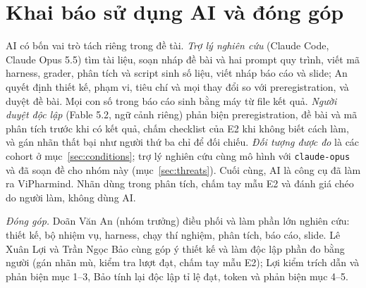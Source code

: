 \section*{Khai báo sử dụng AI và đóng góp}

AI có bốn vai trò tách riêng trong đề tài. \textit{Trợ lý nghiên cứu} (Claude Code, Claude Opus 5.5) tìm tài
liệu, soạn nháp đề bài và hai prompt quy trình, viết mã harness, grader, phân tích và script sinh số liệu, viết
nháp báo cáo và slide; An quyết định thiết kế, phạm vi, tiêu chí và mọi thay đổi so với preregistration, và duyệt
đề bài. Mọi con số trong báo cáo sinh bằng máy từ file kết quả. \textit{Người duyệt độc lập} (Fable 5.2, ngữ
cảnh riêng) phản biện preregistration, đề bài và mã phân tích trước khi có kết quả, chấm checklist của E2 khi
không biết cách làm, và gán nhãn thất bại như người thứ ba chỉ để đối chiếu. \textit{Đối tượng được đo} là các
cohort ở mục~\ref{sec:conditions}; trợ lý nghiên cứu cùng mô hình với \texttt{claude-opus} và đã soạn đề cho nhóm
này (mục~\ref{sec:threats}). Cuối cùng, AI là công cụ đã làm ra ViPharmind. Nhãn dùng trong phân tích, chấm tay
mẫu E2 và đánh giá chéo do người làm, không dùng AI.

\textit{Đóng góp.} Doãn Văn An (nhóm trưởng) điều phối và làm phần lớn nghiên cứu: thiết kế, bộ nhiệm vụ,
harness, chạy thí nghiệm, phân tích, báo cáo, slide. Lê Xuân Lợi và Trần Ngọc Bảo cùng góp ý thiết kế và làm
độc lập phần đo bằng người (gán nhãn mù, kiểm tra lượt đạt, chấm tay mẫu E2); Lợi kiểm trích dẫn và phản biện
mục 1--3, Bảo tính lại độc lập tỉ lệ đạt, token và phản biện mục 4--5.
